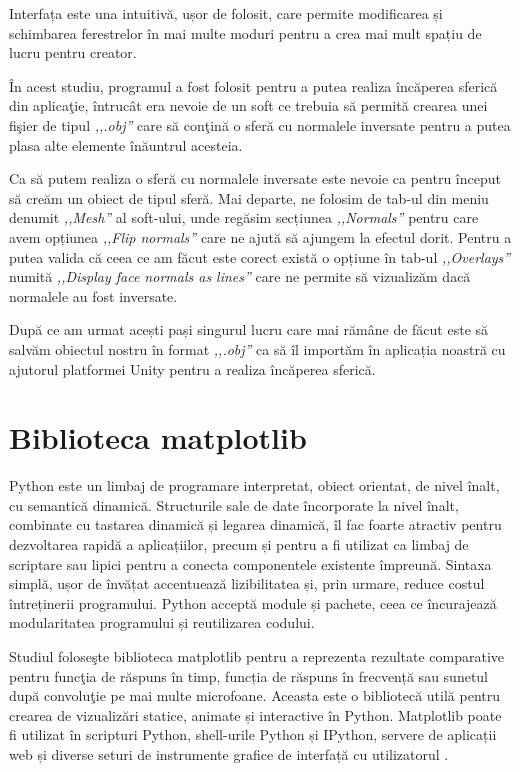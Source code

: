 	Interfața este una intuitivă, ușor de folosit, care permite modificarea și schimbarea ferestrelor în mai multe moduri pentru a crea mai mult spațiu de lucru pentru creator.
	
	\^{I}n acest studiu, programul a fost folosit pentru a putea realiza \^{i}nc\u{a}perea sferic\u{a} din aplica\c{t}ie, \^{i}ntruc\^{a}t era nevoie de un soft ce trebuia s\u{a} permit\u{a} crearea unei fi\c{s}ier de tipul \textit{,,.obj''} care s\u{a} con\c{t}in\u{a} o sfer\u{a} cu normalele inversate pentru a putea plasa alte elemente \^{i}n\u{a}untrul acesteia.
	
	Ca să putem realiza o sferă cu normalele inversate este nevoie ca pentru început să creăm un obiect de tipul sferă. Mai departe, ne folosim de tab-ul din meniu denumit \textit{,,Mesh''} al soft-ului, unde regăsim secțiunea \textit{,,Normals''} pentru care avem opțiunea \textit{,,Flip normals''} care ne ajută să ajungem la efectul dorit. Pentru a putea valida că ceea ce am făcut este corect există o opțiune în tab-ul \textit{,,Overlays''} numită \textit{,,Display face normals as lines''} care ne permite să vizualizăm dacă normalele au fost inversate.
	
	După ce am urmat acești pași singurul lucru care mai rămâne de făcut este să salvăm obiectul nostru în format \textit{,,.obj''} ca să îl importăm în aplicația noastră cu ajutorul platformei Unity pentru a realiza încăperea sferică.
	
\section{Biblioteca matplotlib}

	Python este un limbaj de programare interpretat, obiect orientat, de nivel înalt, cu semantică dinamică. Structurile sale de date încorporate la nivel înalt, combinate cu tastarea dinamică și legarea dinamică, îl fac foarte atractiv pentru dezvoltarea rapidă a aplicațiilor, precum și pentru a fi utilizat ca limbaj de scriptare sau lipici pentru a conecta componentele existente împreună. Sintaxa simplă, ușor de învățat accentuează lizibilitatea și, prin urmare, reduce costul întreținerii programului. Python acceptă module și pachete, ceea ce încurajează modularitatea programului și reutilizarea codului.
	
	Studiul folose\c{s}te biblioteca matplotlib pentru a reprezenta rezultate comparative pentru func\c{t}ia de r\u{a}spuns \^{i}n timp, funcția de răspuns în frecvență sau sunetul dup\u{a} convolu\c{t}ie pe mai multe microfoane. Aceasta este o bibliotecă util\u{a} pentru crearea de vizualizări statice, animate și interactive în Python. Matplotlib poate fi utilizat în scripturi Python, shell-urile Python și IPython, servere de aplicații web și diverse seturi de instrumente grafice de interfață cu utilizatorul \cite{python}.
	
